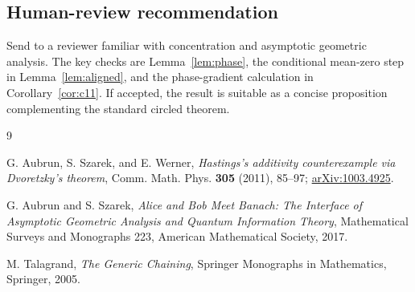 \documentclass[11pt]{article}
\theoremstyle{remark}
\begin{document}
\subsection*{Human-review recommendation}

Send to a reviewer familiar with concentration and asymptotic geometric
analysis.  The key checks are Lemma~\ref{lem:phase}, the conditional
mean-zero step in Lemma~\ref{lem:aligned}, and the phase-gradient calculation
in Corollary~\ref{cor:c11}.  If accepted, the result is suitable as a concise
proposition complementing the standard circled theorem.

\begin{thebibliography}{9}

G. Aubrun, S. Szarek, and E. Werner,
\emph{Hastings's additivity counterexample via Dvoretzky's theorem},
Comm. Math. Phys. \textbf{305} (2011), 85--97;
\href{https://arxiv.org/abs/1003.4925}{arXiv:1003.4925}.

G. Aubrun and S. Szarek,
\emph{Alice and Bob Meet Banach: The Interface of Asymptotic Geometric
Analysis and Quantum Information Theory},
Mathematical Surveys and Monographs 223,
American Mathematical Society, 2017.

M. Talagrand,
\emph{The Generic Chaining},
Springer Monographs in Mathematics, Springer, 2005.

\end{thebibliography}
\end{document}
